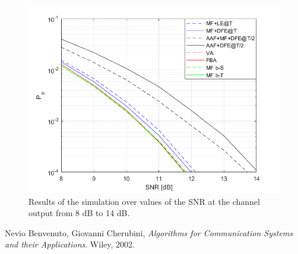 \documentclass[a4paper,11.5pt]{article}
\begin{document}
\begin{figure}[ht]
	\begin{center}   
		\includegraphics[width=\textwidth]{figs/SNR_Pe.png} 
		\caption{Results of the simulation over values of the SNR at the channel output from 8 dB to 14 dB.}
		\label{fig:SNR}
	\end{center}
\end{figure}


 




\begin{thebibliography}{15}
	
	Nevio Benvenuto, Giovanni Cherubini,
	\textit{Algorithms for Communication Systems and their Applications}. 
	Wiley, 2002.
	

	
\end{thebibliography}
\end{document}
